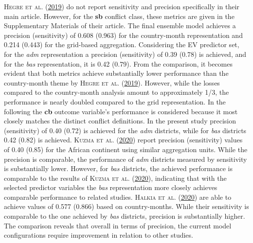 \documentclass[a4paper,11pt]{article}
\begin{document}
\textsc{\textnormal{Hegre} \textnormal{et al.}} \textsc{(\textnormal{\protect\hyperlink{ref-hegre2019}{2019}})} do not report sensitivity and precision specifically in their main
article. However, for the \textbf{sb} conflict class, these metrics are given in the
Supplementary Materials of their article. The final ensemble model
achieves a precision (sensitivity) of 0.608 (0.963) for the country-month
representation and 0.214 (0.443) for the grid-based aggregation. Considering the
EV predictor set, for the \emph{adm} representation a precision (sensitivity) of
0.39 (0.78) is achieved, and for the \emph{bas} representation, it is 0.42 (0.79).
From the comparison, it becomes evident that both metrics achieve substantially
lower performance than the country-month theme by \textsc{\textnormal{Hegre} \textnormal{et al.}} \textsc{(\textnormal{\protect\hyperlink{ref-hegre2019}{2019}})}. However,
while the losses compared to the country-month analysis amount to approximately 1/3,
the performance is nearly doubled compared to the grid representation.
In the following the \textbf{cb} outcome variable's performance is considered because
it most closely matches the distinct conflict definitions. In the present study
precision (sensitivity) of 0.40 (0.72) is achieved for the \emph{adm} districts, while
for \emph{bas} districts 0.42 (0.82) is achieved. \textsc{\textnormal{Kuzma} \textnormal{et al.}} \textsc{(\textnormal{\protect\hyperlink{ref-kuzma2020}{2020}})} report precision (sensitivity)
values of 0.40 (0.85) for the African continent using similar aggregation units.
While the precision is comparable, the performance of \emph{adm} districts measured
by sensitivity is substantially lower. However, for \emph{bas} districts, the achieved
performance is comparable to the results of \textsc{\textnormal{Kuzma} \textnormal{et al.}} \textsc{(\textnormal{\protect\hyperlink{ref-kuzma2020}{2020}})}, indicating that with the
selected predictor variables the \emph{bas} representation more closely achieves
comparable performance to related studies. \textsc{\textnormal{Halkia} \textnormal{et al.}} \textsc{(\textnormal{\protect\hyperlink{ref-halkia2020a}{2020}})} are able to achieve values
of 0.577 (0.866) based on country-months. While their sensitivity is comparable
to the one achieved by \emph{bas} districts, precision is substantially higher. The
comparison reveals that overall in terms of precision, the current model
configurations require improvement in relation to other studies.
\end{document}
